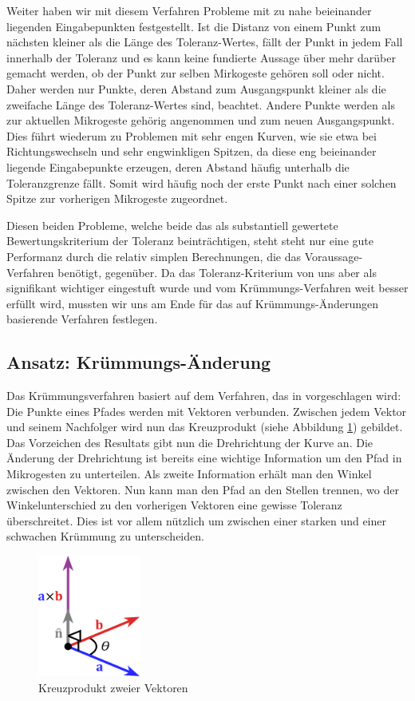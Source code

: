 Weiter haben wir mit diesem Verfahren Probleme mit zu nahe beieinander liegenden Eingabepunkten festgestellt. Ist die Distanz von einem Punkt zum nächsten kleiner als die Länge des Toleranz-Wertes, fällt der Punkt in jedem Fall innerhalb der Toleranz und es kann keine fundierte Aussage über mehr darüber gemacht werden, ob der Punkt zur selben Mirkogeste gehören soll oder nicht. Daher werden nur Punkte, deren Abstand zum Ausgangspunkt kleiner als die zweifache Länge des Toleranz-Wertes sind, beachtet. Andere Punkte werden als zur aktuellen Mikrogeste gehörig angenommen und zum neuen Ausgangspunkt. Dies führt wiederum zu Problemen mit sehr engen Kurven, wie sie etwa bei Richtungswechseln und sehr engwinkligen Spitzen, da diese eng beieinander liegende Eingabepunkte erzeugen, deren Abstand häufig unterhalb die Toleranzgrenze fällt. Somit wird häufig noch der erste Punkt nach einer solchen Spitze zur vorherigen Mikrogeste zugeordnet.

Diesen beiden Probleme, welche beide das als substantiell gewertete Bewertungskriterium der Toleranz beinträchtigen, steht steht nur eine gute Performanz durch die relativ simplen Berechnungen, die das Voraussage-Verfahren benötigt, gegenüber. Da das Toleranz-Kriterium von uns aber als signifikant wichtiger eingestuft wurde und vom Krümmungs-Verfahren weit besser erfüllt wird, mussten wir uns am Ende für das auf Krümmungs-Änderungen basierende Verfahren festlegen.


\subsection{Ansatz: Krümmungs-Änderung}
Das Krümmungsverfahren basiert auf dem Verfahren, das in \cite{zeichenerkennung_pa} vorgeschlagen wird: Die Punkte eines Pfades werden mit Vektoren verbunden. Zwischen jedem Vektor und seinem Nachfolger wird nun das Kreuzprodukt (siehe Abbildung \ref{kreuzprodukt}) gebildet. Das Vorzeichen des Resultats gibt nun die Drehrichtung der Kurve an. Die Änderung der Drehrichtung ist bereits eine wichtige Information um den Pfad in Mikrogesten zu unterteilen.
Als zweite Information erhält man den Winkel zwischen den Vektoren. Nun kann man den Pfad an den Stellen trennen, wo der Winkelunterschied zu den vorherigen Vektoren eine gewisse Toleranz überschreitet. Dies ist vor allem nützlich um zwischen einer starken und einer schwachen Krümmung zu unterscheiden.

\begin{figure}[h!]
  \centering
    \includegraphics[width=0.3\textwidth]{./img/crossproduct.pdf}
  \caption{Kreuzprodukt zweier Vektoren}
  \label{kreuzprodukt}
\end{figure}

